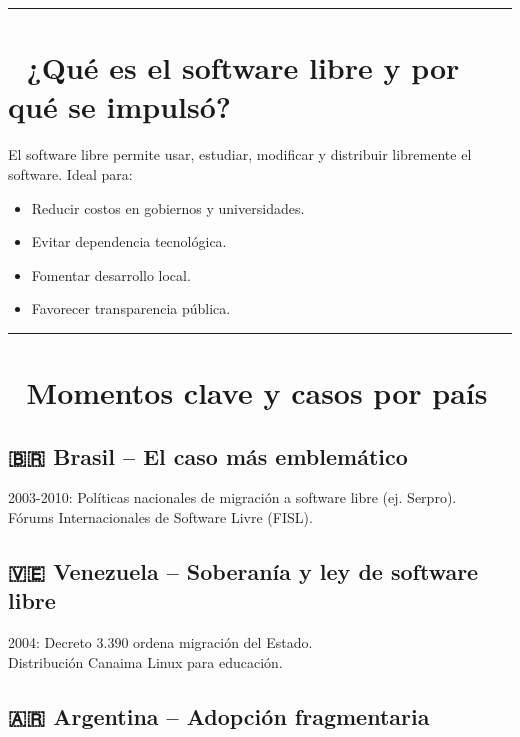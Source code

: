 \documentclass[
  letterpaper,
  DIV=11,
  numbers=noendperiod]{scrreprt}
\providecommand{\tightlist}{%
  \setlength{\itemsep}{0pt}\setlength{\parskip}{0pt}}
\begin{document}
\begin{center}\rule{0.5\linewidth}{0.5pt}\end{center}

\section{🧭 ¿Qué es el software libre y por qué se
impulsó?}\label{quuxe9-es-el-software-libre-y-por-quuxe9-se-impulsuxf3}

El software libre permite usar, estudiar, modificar y distribuir
libremente el software. Ideal para:

\begin{itemize}
\tightlist
\item
  Reducir costos en gobiernos y universidades.
\item
  Evitar dependencia tecnológica.
\item
  Fomentar desarrollo local.
\item
  Favorecer transparencia pública.
\end{itemize}

\begin{center}\rule{0.5\linewidth}{0.5pt}\end{center}

\section{📌 Momentos clave y casos por
país}\label{momentos-clave-y-casos-por-pauxeds}

\subsection{🇧🇷 Brasil -- El caso más
emblemático}\label{brasil-el-caso-muxe1s-emblemuxe1tico}

2003-2010: Políticas nacionales de migración a software libre (ej.
Serpro).\\
Fórums Internacionales de Software Livre (FISL).

\subsection{🇻🇪 Venezuela -- Soberanía y ley de software
libre}\label{venezuela-soberanuxeda-y-ley-de-software-libre}

2004: Decreto 3.390 ordena migración del Estado.\\
Distribución Canaima Linux para educación.

\subsection{🇦🇷 Argentina -- Adopción
fragmentaria}\label{argentina-adopciuxf3n-fragmentaria}
\end{document}
